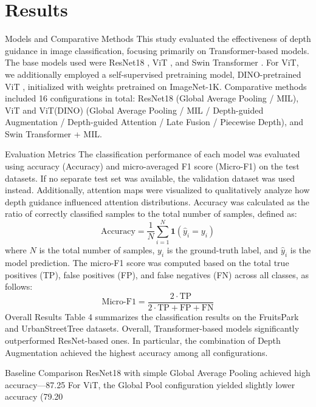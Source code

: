 \documentclass{article}
\begin{document}
\section{Results}
Models and Comparative Methods
This study evaluated the effectiveness of depth guidance in image classification, focusing primarily on Transformer-based models. The base models used were ResNet18 \cite{ref12}, ViT \cite{ref1}, and Swin Transformer \cite{ref14}. For ViT, we additionally employed a self-supervised pretraining model, DINO-pretrained ViT \cite{ref13}, initialized with weights pretrained on ImageNet-1K. Comparative methods included 16 configurations in total: ResNet18 (Global Average Pooling / MIL), ViT and ViT(DINO) (Global Average Pooling / MIL / Depth-guided Augmentation / Depth-guided Attention / Late Fusion / Piecewise Depth), and Swin Transformer + MIL.

Evaluation Metrics
The classification performance of each model was evaluated using accuracy (Accuracy) and micro-averaged F1 score (Micro-F1) on the test datasets. If no separate test set was available, the validation dataset was used instead. Additionally, attention maps were visualized to qualitatively analyze how depth guidance influenced attention distributions. 
Accuracy was calculated as the ratio of correctly classified samples to the total number of samples, defined as:
\begin{equation}\tag{14}
\mathrm{Accuracy}=\frac{1}{N}\sum_{i=1}^{N}\mathbf{1}(\hat{y}_i=y_i)
\end{equation}
where $N$ is the total number of samples, $y_i$ is the ground-truth label, and $\hat{y}_i$ is the model prediction. 
The micro-F1 score was computed based on the total true positives (TP), false positives (FP), and false negatives (FN) across all classes, as follows:
\begin{equation}\tag{15}
\mathrm{Micro\mbox{-}F1}=\frac{2\cdot \mathrm{TP}}{2\cdot \mathrm{TP}+\mathrm{FP}+\mathrm{FN}}
\end{equation}
Overall Results
Table 4 summarizes the classification results on the FruitsPark and UrbanStreetTree datasets. Overall, Transformer-based models significantly outperformed ResNet-based ones. In particular, the combination of Depth Augmentation achieved the highest accuracy among all configurations.

Baseline Comparison
ResNet18 with simple Global Average Pooling achieved high accuracy—87.25%
For ViT, the Global Pool configuration yielded slightly lower accuracy (79.20%
\end{document}
